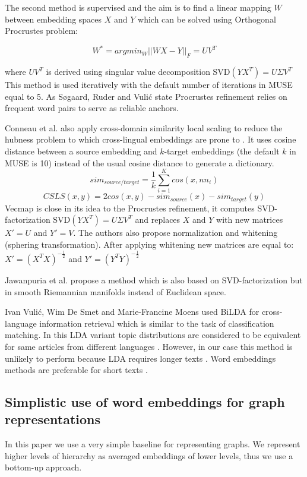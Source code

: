 \documentclass[11pt,a4paper]{article}
\begin{document}
The second method is supervised and the aim is to find a linear mapping $W$ between embedding spaces $X$ and $Y$ which can be solved using Orthogonal Procrustes problem:

$$ W^* = argmin_W ||WX - Y||_F = UV^T$$

where $UV^T$ is derived using singular value decomposition SVD$(YX^T) = U \Sigma V^T$
This method is used iteratively with the default number of iterations in MUSE equal to 5. As Søgaard, Ruder and Vulić state Procrustes refinement relies on frequent word pairs to serve as reliable anchors.

Conneau et al. also apply cross-domain similarity local scaling to reduce the hubness problem to which cross-lingual embeddings are prone to \cite{dinu}. It uses cosine distance between a source embedding and $k$-target embeddings (the default $k$ in MUSE is 10) instead of the usual cosine distance to generate a dictionary.
$$sim_{source/target} = \dfrac{1}{k}\sum_{i=1}^Kcos(x, nn_i)$$
\small
$$CSLS(x,y) = 2cos(x,y) - sim_{source}(x)  - sim_{target}(y)$$
\normalsize
Vecmap \cite{vecmap} is close in its idea to the Procrustes refinement, it computes SVD-factorization SVD$(YX^T) = U\Sigma V^T$ and replaces $X$ and $Y$ with new matrices $X' = U$ and $Y' = V$. The authors also propose normalization and whitening (sphering transformation). After applying whitening new matrices are equal to:
$X' = (X^TX)^{-\tfrac{1}{2}}$ and $Y' = (Y^TY)^{-\tfrac{1}{2}}$

Jawanpuria et al. \cite{jawanpuria} propose a method which is also based on SVD-factorization but in smooth Riemannian manifolds instead of Euclidean space.

Ivan Vulić, Wim De Smet and Marie-Francine Moens  used BiLDA for cross-language information retrieval which is similar to the task of classification matching. In this LDA variant topic distributions are considered to be equivalent for same articles from different languages \cite{bilda}. However, in our case this method is unlikely to perform because LDA requires longer texts \cite{short-lda}. Word embeddings methods are preferable for short texts \cite{maslova-potapov}.

\subsection{Simplistic use of word embeddings for graph representations}
In this paper we use a very simple baseline for representing graphs. We represent higher levels of hierarchy as averaged embeddings of lower levels, thus we use a bottom-up approach.
\end{document}

